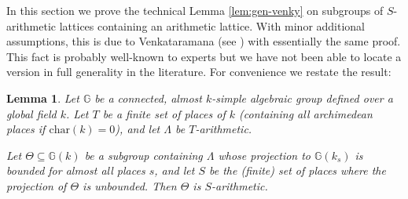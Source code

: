 \documentclass[JEP,XML,SOM,Unicode,published]{cedram}
\newcommand{\bbG}{\ensuremath{\mathbb{G}}}
\newtheorem{lemma}[thm]{Lemma}
\theoremstyle{definition}
\begin{document}
In this section we prove the technical Lemma \ref{lem:gen-venky} on subgroups of $S$-arithmetic lattices containing an arithmetic lattice. With minor additional assumptions, this is due to Venkataramana (see \cite[Prop.\,2.3]{lubotzky-zimmer}) with essentially the same proof. This fact is probably well-known to experts but we have not been able to locate a version in full generality in the literature. For convenience we restate the result:
\begin{lemma}\label{lem:regen-venky}
Let $\bbG$ be a connected, almost $k$-simple algebraic group defined over a global field $k$. Let $T$ be a finite set of places of $k$ (containing all archimedean places if $\mathrm{char}(k)=0$), and let $\Lambda$ be $T$-arithmetic.

Let $\Theta\subseteq \bbG(k)$ be a subgroup containing $\Lambda$ whose projection to $\bbG(k_s)$ is bounded for almost all places $s$, and let $S$ be the (finite) set of places where the projection of $\Theta$ is unbounded. Then $\Theta$ is $S$-arithmetic.
\end{lemma}
\end{document}
